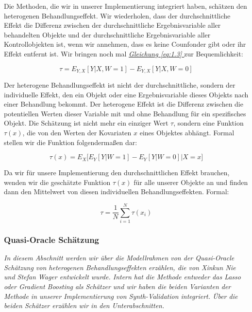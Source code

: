 \documentclass[12pt,a4paper,twoside]{scrartcl}
\numberwithin{equation}{section}
\renewcommand*{\refeq}[1]{\emph{\hyperref[#1]{Gleichung \ref*{#1} }}}
\begin{document}
Die Methoden, die wir in unserer Implementierung integriert haben, schätzen den heterogenen Behandlungseffekt. Wir wiederholen, dass der durchschnittliche Effekt die Differenz zwischen der durchschnittliche Ergebnisvariable aller behandelten Objekte und der durchschnittliche Ergebnisvariable aller Kontrollobjekten ist, wenn wir annehmen, dass es keine Counfonder gibt oder ihr Effekt entfernt ist. Wir bringen noch mal \refeq{eq:1.3} zur Bequemlichkeit:\par  

\begin{equation}\label{eq:2.11}
  \tau = E_{Y,X}[Y|X,W = 1] - E_{Y,X}[Y|X,W = 0]
\end{equation}

\noindent
Der heterogene Behandlungseffekt ist nicht der durchschnittliche, sondern der individuelle Effekt, den ein Objekt oder eine Ergebnisvariable dieses Objekts nach einer Behandlung bekommt. Der heterogene Effekt ist die Differenz zwischen die potentiellen Werten dieser Variable mit und ohne Behandlung für ein spezifisches Objekt. Die  Schätzung ist nicht mehr ein einziger Wert $\tau$, sondern eine Funktion $\tau(x)$, die von den Werten der Kovariaten $x$ eines Objektes abhängt. Formal stellen wir die Funktion folgendermaßen dar:\par

\begin{equation}\label{eq:2.12}
  \tau(x) = E_X \Big [ E_{Y}[Y|W = 1] - E_{Y}[Y|W = 0] \Big | X=x \Big ]
\end{equation}

\noindent
Da wir für unsere Implementierung den durchschnittlichen Effekt brauchen, wenden wir die geschätzte Funktion $\tau(x)$ für alle unserer Objekte an und finden dann den Mittelwert von diesen individuellen Behandlungseffekten. Formal:\par

\begin{equation}\label{eq:2.13}
  \tau = \frac{1}{N} \sum_{i=1}^{N} \tau(x_i)
\end{equation}
  
\subsubsection{Quasi-Oracle Schätzung}\label{subsubsec:quasioracle}
\noindent
\emph{In diesem Abschnitt werden wir über die Modellrahmen von der Quasi-Oracle Schätzung von heterogenen Behandlungseffekten\cite{nie2017quasi} erzählen, die von Xinkun Nie und Stefan Wager entwickelt wurde. Intern hat die Methode entweder das Lasso oder Gradient Boosting als Schätzer und wir haben die beiden Varianten der Methode in unserer Implementierung von Synth-Validation integriert. Über die beiden Schätzer erzählen wir in den Unterabschnitten.}\par  
\end{document}
